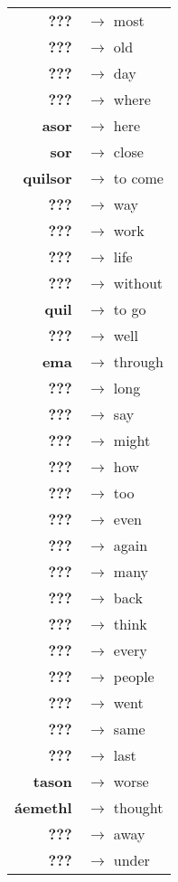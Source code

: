 \begin{tabular}{rl}
\textbf{???} & $\rightarrow$ most \\
\textbf{???} & $\rightarrow$ old \\
\textbf{???} & $\rightarrow$ day \\
\textbf{???} & $\rightarrow$ where \\
\textbf{asor} & $\rightarrow$ here \\
\textbf{sor} & $\rightarrow$ close \\
\textbf{quilsor} & $\rightarrow$ to come \\
\textbf{???} & $\rightarrow$ way \\
\textbf{???} & $\rightarrow$ work \\
\textbf{???} & $\rightarrow$ life \\
\textbf{???} & $\rightarrow$ without \\
\textbf{quil} & $\rightarrow$ to go \\
\textbf{???} & $\rightarrow$ well \\
\textbf{ema} & $\rightarrow$ through \\
\textbf{???} & $\rightarrow$ long \\
\textbf{???} & $\rightarrow$ say \\
\textbf{???} & $\rightarrow$ might \\
\textbf{???} & $\rightarrow$ how \\
\textbf{???} & $\rightarrow$ too \\
\textbf{???} & $\rightarrow$ even \\
\textbf{???} & $\rightarrow$ again \\
\textbf{???} & $\rightarrow$ many \\
\textbf{???} & $\rightarrow$ back \\
\textbf{???} & $\rightarrow$ think \\
\textbf{???} & $\rightarrow$ every \\
\textbf{???} & $\rightarrow$ people \\
\textbf{???} & $\rightarrow$ went \\
\textbf{???} & $\rightarrow$ same \\
\textbf{???} & $\rightarrow$ last \\
\textbf{tason} & $\rightarrow$ worse \\
\textbf{áemethl} & $\rightarrow$ thought \\
\textbf{???} & $\rightarrow$ away \\
\textbf{???} & $\rightarrow$ under \\

\end{tabular}
